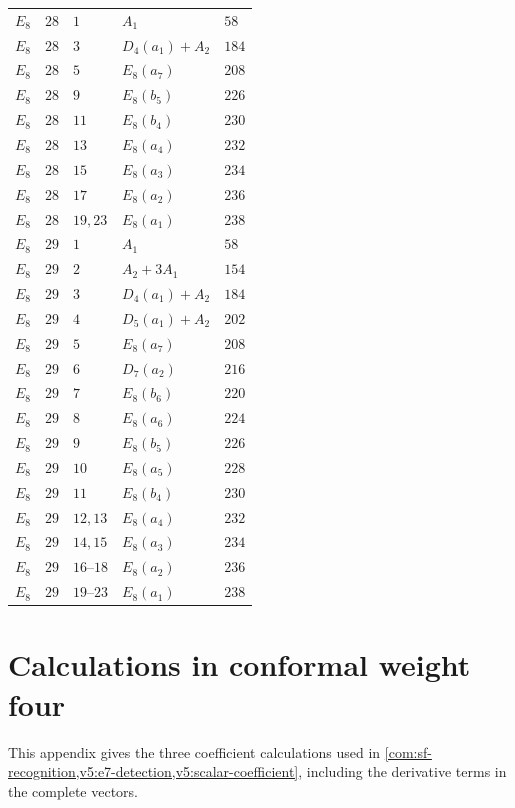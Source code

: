 \documentclass[11pt,a4paper]{amsart}
\numberwithin{equation}{section}
\theoremstyle{definition}
\theoremstyle{remark}
\begin{document}
{\begin{longtable}{@{}p{}p{}p{}p{}p{}@{}}
$E_{8}$&$28$&$1$&$A_{1}$&$58$\\
$E_{8}$&$28$&$3$&$D_{4}(a_{1})+A_{2}$&$184$\\
$E_{8}$&$28$&$5$&$E_{8}(a_{7})$&$208$\\
$E_{8}$&$28$&$9$&$E_{8}(b_{5})$&$226$\\
$E_{8}$&$28$&$11$&$E_{8}(b_{4})$&$230$\\
$E_{8}$&$28$&$13$&$E_{8}(a_{4})$&$232$\\
$E_{8}$&$28$&$15$&$E_{8}(a_{3})$&$234$\\
$E_{8}$&$28$&$17$&$E_{8}(a_{2})$&$236$\\
$E_{8}$&$28$&$19,23$&$E_{8}(a_{1})$&$238$\\
$E_{8}$&$29$&$1$&$A_{1}$&$58$\\
$E_{8}$&$29$&$2$&$A_{2}+3A_{1}$&$154$\\
$E_{8}$&$29$&$3$&$D_{4}(a_{1})+A_{2}$&$184$\\
$E_{8}$&$29$&$4$&$D_{5}(a_{1})+A_{2}$&$202$\\
$E_{8}$&$29$&$5$&$E_{8}(a_{7})$&$208$\\
$E_{8}$&$29$&$6$&$D_{7}(a_{2})$&$216$\\
$E_{8}$&$29$&$7$&$E_{8}(b_{6})$&$220$\\
$E_{8}$&$29$&$8$&$E_{8}(a_{6})$&$224$\\
$E_{8}$&$29$&$9$&$E_{8}(b_{5})$&$226$\\
$E_{8}$&$29$&$10$&$E_{8}(a_{5})$&$228$\\
$E_{8}$&$29$&$11$&$E_{8}(b_{4})$&$230$\\
$E_{8}$&$29$&$12,13$&$E_{8}(a_{4})$&$232$\\
$E_{8}$&$29$&$14,15$&$E_{8}(a_{3})$&$234$\\
$E_{8}$&$29$&$16\text{--}18$&$E_{8}(a_{2})$&$236$\\
$E_{8}$&$29$&$19\text{--}23$&$E_{8}(a_{1})$&$238$\\
\end{longtable}
}

\bigskip



\section{Calculations in conformal weight four}\label{app:weight-four}
This appendix gives the three coefficient calculations used in
\cref{com:sf-recognition,v5:e7-detection,v5:scalar-coefficient},
including the derivative terms in the complete vectors.
\end{document}
